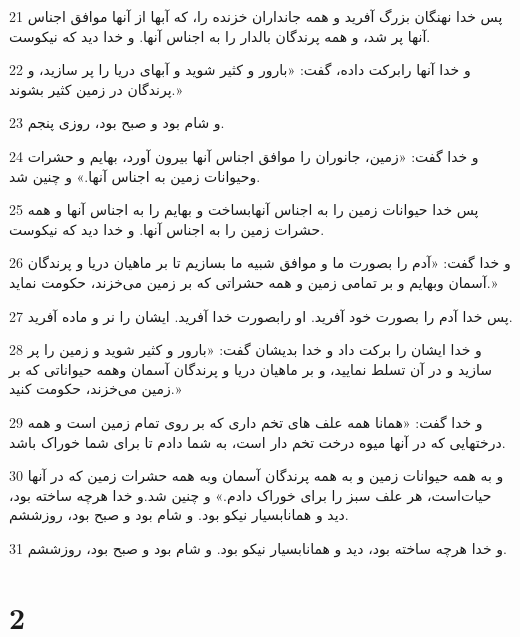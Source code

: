 \par 21 پس خدا نهنگان بزرگ آفرید و همه جانداران خزنده را، که آبها از آنها موافق اجناس آنها پر شد، و همه پرندگان بالدار را به اجناس آنها. و خدا دید که نیکوست.
\par 22 و خدا آنها رابرکت داده، گفت: «بارور و کثیر شوید و آبهای دریا را پر سازید، و پرندگان در زمین کثیر بشوند.»
\par 23 و شام بود و صبح بود، روزی پنجم.
\par 24 و خدا گفت: «زمین، جانوران را موافق اجناس آنها بیرون آورد، بهایم و حشرات وحیوانات زمین به اجناس آنها.» و چنین شد.
\par 25 پس خدا حیوانات زمین را به اجناس آنهابساخت و بهایم را به اجناس آنها و همه حشرات زمین را به اجناس آنها. و خدا دید که نیکوست.
\par 26 و خدا گفت: «آدم را بصورت ما و موافق شبیه ما بسازیم تا بر ماهیان دریا و پرندگان آسمان وبهایم و بر تمامی زمین و همه حشراتی که بر زمین می‌خزند، حکومت نماید.»
\par 27 پس خدا آدم را بصورت خود آفرید. او رابصورت خدا آفرید. ایشان را نر و ماده آفرید.
\par 28 و خدا ایشان را برکت داد و خدا بدیشان گفت: «بارور و کثیر شوید و زمین را پر سازید و در آن تسلط نمایید، و بر ماهیان دریا و پرندگان آسمان وهمه حیواناتی که بر زمین می‌خزند، حکومت کنید.»
\par 29 و خدا گفت: «همانا همه علف های تخم داری که بر روی تمام زمین است و همه درختهایی که در آنها میوه درخت تخم دار است، به شما دادم تا برای شما خوراک باشد.
\par 30 و به همه حیوانات زمین و به همه پرندگان آسمان وبه همه حشرات زمین که در آنها حیات‌است، هر علف سبز را برای خوراک دادم.» و چنین شد.و خدا هر‌چه ساخته بود، دید و همانابسیار نیکو بود. و شام بود و صبح بود، روزششم.
\par 31 و خدا هر‌چه ساخته بود، دید و همانابسیار نیکو بود. و شام بود و صبح بود، روزششم.
 
\chapter{2}

